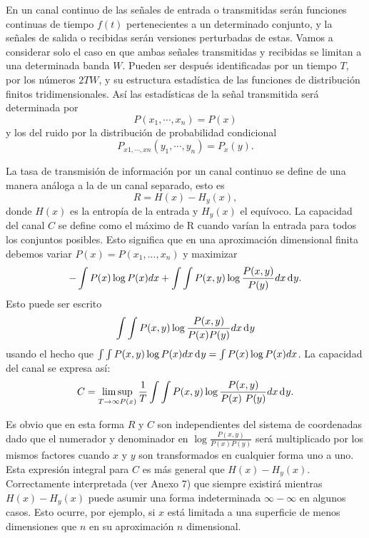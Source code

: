 	En un canal continuo de las se\~nales de entrada o
	transmitidas ser\'an funciones continuas de tiempo $f(t)$
	pertenecientes a un determinado conjunto, y la señales de
	salida o recibidas ser\'an versiones perturbadas de
	estas. Vamos a considerar solo el caso en que ambas se\~nales
	transmitidas y recibidas se limitan a una determinada banda
	$W$. Pueden ser despu\'es identificadas por un tiempo $T$, por
	los n\'umeros $2TW$, y su estructura estad\'istica de las
	funciones de distribuci\'on finitos tridimensionales. As\'i
	las estad\'isticas de la se\~nal transmitida ser\'a
	determinada por
	\begin{equation}
		P(x_{1}, \cdots ,x_{n}) = P(x)
	\end{equation}	 
	y los del ruido por la distribuci\'on de probabilidad condicional
	\begin{equation}
		P_{x1, \cdots ,xn} (y_{1}, \cdots ,y_{n}) = P_{x}(y).
	\end{equation}
	
	La tasa de transmisi\'on de informaci\'on por un canal
	continuo se define de una manera an\'aloga a la de un canal
	separado, esto es \begin{equation} R =
	H(x)-H_{y}(x), \end{equation} donde $H(x)$ es la entrop\'ia de
	la entrada y $H_{y}(x)$ el equ\'ivoco. La capacidad del canal
	$C$ se define como el m\'aximo de R cuando var\'ian la entrada
	para todos los conjuntos posibles. Esto significa que en una
	aproximaci\'on dimensional finita debemos variar $P(x) =
	P(x_{1},...,x_{n})$ y maximizar \begin{equation} - \int
	P(x) \log P(x)dx + \int\int
	P(x,y)\log \frac{P(x,y)}{P(y)}dx \diff y.  \end{equation} Esto puede
	ser escrito \begin{equation} \int\int
	P(x,y) \log \frac{P(x,y)}{P(x)P(y)}dx \diff y \end{equation} usando
	el hecho que $\int\int P(x,y)\log P(x)dx \diff y = \int P(x)\log
	P(x)dx$. La capacidad del canal se expresa as\'i:
	\begin{equation}
		C = \limsup_{T\to \infty P(x)} \frac{1}{T}\int\int P(x,y)\log \frac{P(x,y)}{P(x)~
		P(y)}dx \diff y.
	\end{equation}
	
	Es obvio que en esta forma $R$ y $C$ son independientes del
	sistema de coordenadas dado que el numerador y denominador en
	$\log\frac{P(x,y)}{P(x)P(y)}$ ser\'a multiplicado por los
	mismos factores cuando $x$ y $y$ son transformados en
	cualquier forma uno a uno. Esta expresi\'on integral para $C$
	es m\'{a}s general que $H(x)-H_{y}(x)$. Correctamente
	interpretada (ver Anexo 7) que siempre existir\'a mientras
	$H(x)-H_{y}(x)$ puede asumir una forma indeterminada $\infty
	- \infty$ en algunos casos. Esto ocurre, por ejemplo, si $x$
	est\'a limitada a una superficie de menos dimensiones que $n$
	en su aproximaci\'on $n$ dimensional.
	
